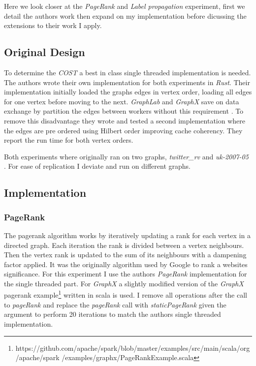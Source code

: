 Here we look closer at the \textit{PageRank} and \textit{Label propagation} experiment, first we detail the authors work then expand on my implementation before dicussing the extensions to their work I apply.

\subsection{Original Design} \label{sec:hilbert}
To determine the \textit{COST} a best in class single threaded implementation is needed. The authors wrote their own implementation for both experiments in \textit{Rust}. Their implementation initially loaded the graphs edges in vertex order, loading all edges for one vertex before moving to the next. \textit{GraphLab} and \textit{GraphX} save on data exchange by partition the edges between workers without this requirement \cite{graphlab,graphx}. To remove this disadvantage they wrote and tested a second implementation where the edges are pre ordered using Hilbert order improving cache coherency. They report the run time for both vertex orders.

Both experiments where originally ran on two graphs, \textit{twitter\_rv} \cite{twitter} and \textit{uk-2007-05} \cite{uk2007}. For ease of replication I deviate and run on different graphs.

\subsection{Implementation} \label{sec:hilbert}
\subsubsection{PageRank}
The pagerank algorithm works by iteratively updating a rank for each vertex in a directed graph. Each iteration the rank is divided between a vertex neighbours. Then the vertex rank is updated to the sum of its neighbours with a dampening factor applied. It was the originally algorithm used by Google to rank a websites significance. For this experiment I use the authors \textit{PageRank} implementation for the single threaded part. For \textit{GraphX} a slightly modified version of the \textit{GraphX} pagerank example\footnote{https://github.com/apache/spark/blob/master/examples/src/main/scala/org/apache/spark /examples/graphx/PageRankExample.scala} written in scala is used. I remove all operations after the call to \textit{pageRank} and replace the \textit{pageRank} call with \textit{staticPageRank} given the argument to perform 20 iterations to match the authors single threaded implementation.

